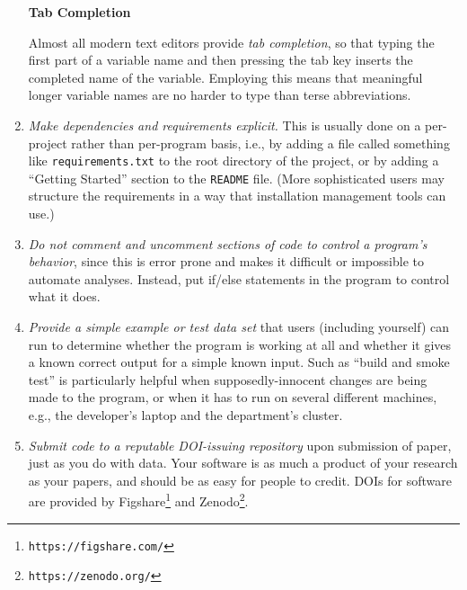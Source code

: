 \documentclass[10pt]{article}
\newcommand{\recommend}[1]{\textit{#1}}
\newcommand{\withurl}[2]{{#1}\footnote{\texttt{#2}}}
\begin{document}
\begin{enumerate}
  \begin{framed}
    \noindent \textbf{Tab Completion}

    Almost all modern text editors provide \emph{tab completion}, so
    that typing the first part of a variable name and then pressing
    the tab key inserts the completed name of the variable.  Employing
    this means that meaningful longer variable names are no harder to type
    than terse abbreviations.

  \end{framed}

\item
  \recommend{Make dependencies and requirements explicit.} This is
  usually done on a per-project rather than per-program basis, i.e.,
  by adding a file called something like \texttt{requirements.txt} to
  the root directory of the project, or by adding a ``Getting
  Started'' section to the \texttt{README} file. (More sophisticated
  users may structure the requirements in a way that installation
  management tools can use.)

\item
  \recommend{Do not comment and uncomment sections of code to control
    a program's behavior}, since this is error prone and makes it
  difficult or impossible to automate analyses. Instead, put if/else
  statements in the program to control what it does.

\item
  \recommend{Provide a simple example or test data set} that users
  (including yourself) can run to determine whether the program is
  working at all and whether it gives a known correct output for a
  simple known input. Such as ``build and smoke test'' is particularly
  helpful when supposedly-innocent changes are being made to the
  program, or when it has to run on several different machines, e.g.,
  the developer's laptop and the department's cluster.

\item
  \recommend{Submit code to a reputable DOI-issuing repository} upon
  submission of paper, just as you do with data. Your software is as
  much a product of your research as your papers, and should be as
  easy for people to credit. DOIs for software are provided by
  \withurl{Figshare}{https://figshare.com/} and
  \withurl{Zenodo}{https://zenodo.org/}.

\end{enumerate}
\end{document}
